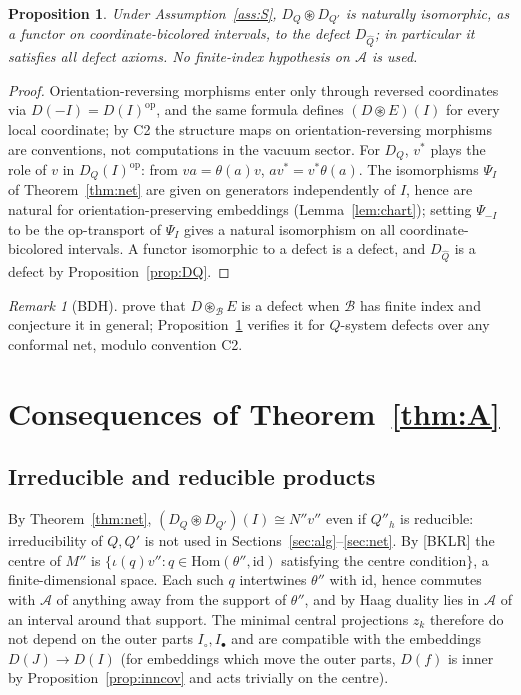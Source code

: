 \documentclass[11pt]{article}
\newtheorem{proposition}[theorem]{Proposition}
\theoremstyle{definition}
\theoremstyle{remark}
\newtheorem{remark}[theorem]{Remark}
\newcommand{\cA}{\mathcal A}
\newcommand{\cB}{\mathcal B}
\newcommand{\cfus}{\circledast}
\begin{document}
\begin{proposition}\label{prop:defect}
Under Assumption~\ref{ass:S}, $D_Q\cfus D_{Q'}$ is naturally isomorphic, as a functor on coordinate-bicolored intervals, to the defect $D_{\hat Q}$; in particular it satisfies all defect axioms. No finite-index hypothesis on $\cA$ is used.
\end{proposition}
\begin{proof}
Orientation-reversing morphisms enter only through reversed coordinates via $D(-I)=D(I)^{\mathrm{op}}$, and the same formula defines $(D\cfus E)(I)$ for every local coordinate; by C2 the structure maps on orientation-reversing morphisms are conventions, not computations in the vacuum sector. For $D_Q$, $v^*$ plays the role of $v$ in $D_Q(I)^{\mathrm{op}}$: from $va=\theta(a)v$, $av^*=v^*\theta(a)$. The isomorphisms $\Psi_I$ of Theorem~\ref{thm:net} are given on generators independently of $I$, hence are natural for orientation-preserving embeddings (Lemma~\ref{lem:chart}); setting $\Psi_{-I}$ to be the op-transport of $\Psi_I$ gives a natural isomorphism on all coordinate-bicolored intervals. A functor isomorphic to a defect is a defect, and $D_{\hat Q}$ is a defect by Proposition~\ref{prop:DQ}.
\end{proof}
\begin{remark}
[BDH] prove that $D\cfus_\cB E$ is a defect when $\cB$ has finite index and conjecture it in general; Proposition~\ref{prop:defect} verifies it for $Q$-system defects over any conformal net, modulo convention C2.
\end{remark}

\section{Consequences of Theorem~\ref{thm:A}}\label{sec:conseq}
\subsection{Irreducible and reducible products}\label{sec:red}

By Theorem~\ref{thm:net}, $(D_Q\cfus D_{Q'})(I)\cong N''v''$ even if $Q''_h$ is reducible: irreducibility of $Q,Q'$ is not used in Sections~\ref{sec:alg}--\ref{sec:net}. By [BKLR] the centre of $M''$ is $\{\iota(q)v'':q\in\mathrm{Hom}(\theta'',\mathrm{id})$ satisfying the centre condition$\}$, a finite-dimensional space. Each such $q$ intertwines $\theta''$ with $\mathrm{id}$, hence commutes with $\cA$ of anything away from the support of $\theta''$, and by Haag duality lies in $\cA$ of an interval around that support. The minimal central projections $z_k$ therefore do not depend on the outer parts $I_\circ,I_\bullet$ and are compatible with the embeddings $D(J)\to D(I)$ (for embeddings which move the outer parts, $D(f)$ is inner by Proposition~\ref{prop:inncov} and acts trivially on the centre).
\end{document}
